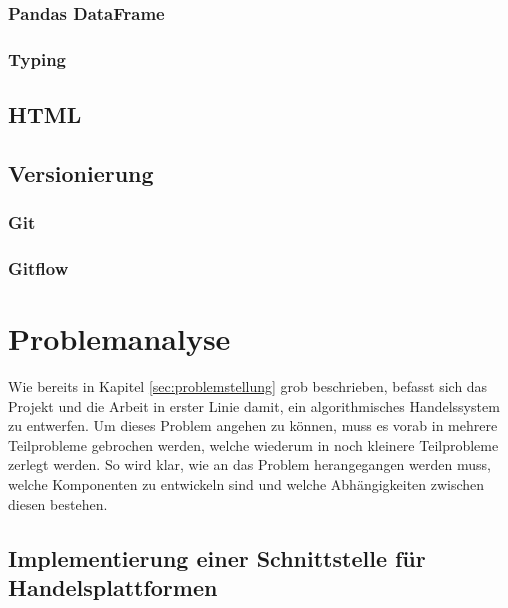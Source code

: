 \documentclass[oneside]{ausarbeitung}
\begin{document}
\subsection{Pandas DataFrame}
\label{sub:dataframe}

\subsection{Typing}
\label{sub:typing}


\section{HTML}
\label{sec:html}


\section{Versionierung}
\label{sec:versionierung}

\subsection{Git}
\label{sub:git}

\subsection{Gitflow}
\label{sub:gitflow}

\chapter{Problemanalyse}
\label{cha:problemanalyse}

Wie bereits in Kapitel \ref{sec:problemstellung} grob beschrieben,
befasst sich das Projekt und die Arbeit in erster Linie damit, ein
algorithmisches Handelssystem zu entwerfen. Um dieses Problem angehen
zu können, muss es vorab in mehrere Teilprobleme gebrochen werden,
welche wiederum in noch kleinere Teilprobleme zerlegt werden. So wird
klar, wie an das Problem herangegangen werden muss, welche Komponenten
zu entwickeln sind und welche Abhängigkeiten zwischen diesen
bestehen.


\section{Implementierung einer Schnittstelle für Handelsplattformen}
\label{sec:schnittstelle_handelsplatform}
\end{document}
